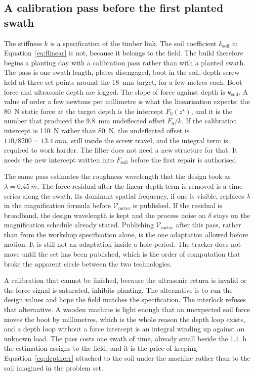 \subsection{A calibration pass before the first planted swath}

The stiffness \(k\) is a specification of the timber link. The soil coefficient \(k_{\mathrm{soil}}\) in Equation~\eqref{eq:flinear} is not, because it belongs to the field. The build therefore begins a planting day with a calibration pass rather than with a planted swath. The pass is one swath length, plates disengaged, boot in the soil, depth screw held at three set-points around the \SI{18}{mm} target, for a few metres each. Boot force and ultrasonic depth are logged. The slope of force against depth is \(k_{\mathrm{soil}}\). A value of order a few newtons per millimetre is what the linearisation expects; the \SI{80}{N} static force at the target depth is the intercept \(F_0(z^{\star})\), and it is the number that produced the \SI{9.8}{mm} undeflected offset \(F_0/k\). If the calibration intercept is \SI{110}{N} rather than \SI{80}{N}, the undeflected offset is \(110/8200=\SI{13.4}{mm}\), still inside the screw travel, and the integral term is required to work harder. The filter does not need a new structure for that. It needs the new intercept written into \(F_{\mathrm{soil}}\) before the first repair is authorised.

The same pass estimates the roughness wavelength that the design took as \(\lambda=\SI{0.45}{m}\). The force residual after the linear depth term is removed is a time series along the swath. Its dominant spatial frequency, if one is visible, replaces \(\lambda\) in the magnification formula before \(\mathcal{V}_{\mathrm{meter}}\) is published. If the residual is broadband, the design wavelength is kept and the process noise on \(\delta\) stays on the magnification schedule already stated. Publishing \(\mathcal{V}_{\mathrm{meter}}\) after this pass, rather than from the workshop specification alone, is the one adaptation allowed before motion. It is still not an adaptation inside a hole period. The tracker does not move until the set has been published, which is the order of computation that broke the apparent circle between the two technologies.

A calibration that cannot be finished, because the ultrasonic return is invalid or the force signal is saturated, inhibits planting. The alternative is to run the design values and hope the field matches the specification. The interlock refuses that alternative. A wooden machine is light enough that an unexpected soil force moves the boot by millimetres, which is the whole reason the depth loop exists, and a depth loop without a force intercept is an integral winding up against an unknown load. The pass costs one swath of time, already small beside the \SI{1.4}{h} the estimation assigns to the field, and it is the price of keeping Equation~\eqref{eq:deptherr} attached to the soil under the machine rather than to the soil imagined in the problem set.

